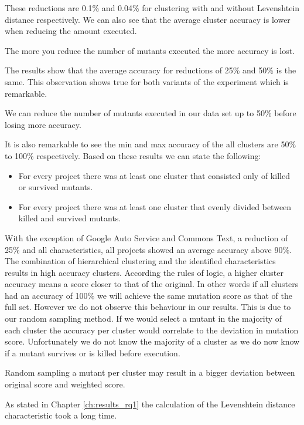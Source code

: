 \documentclass[../main]{subfiles}
\begin{document}
These reductions are 0.1\% and 0.04\% for clustering with and without Levenshtein distance respectively.
We can also see that the average cluster accuracy is lower when reducing the amount executed.
\begin{finding}
    The more you reduce the number of mutants executed the more accuracy is lost.
\end{finding}
The results show that the average accuracy for reductions of 25\% and 50\% is the same.
This observation shows true for both variants of the experiment which is remarkable.
\begin{finding}
    We can reduce the number of mutants executed in our data set up to 50\% before losing more accuracy.
\end{finding}
It is also remarkable to see the min and max accuracy of the all clusters are 50\% to 100\% respectively.
Based on these results we can state the following:
\begin{itemize}
    \item For every project there was at least one cluster that consisted only of killed or survived mutants.
    \item For every project there was at least one cluster that evenly divided between killed and survived mutants.
\end{itemize}
With the exception of Google Auto Service and Commons Text, a reduction of 25\% and all characteristics, all projects showed an average accuracy above 90\%.
The combination of hierarchical clustering and the identified characteristics results in high accuracy clusters.
\newline
According the rules of logic, a higher cluster accuracy means a score closer to that of the original.
In other words if all clusters had an accuracy of 100\% we will achieve the same mutation score as that of the full set.
However we do not observe this behaviour in our results.
This is due to our random sampling method.
If we would select a mutant in the majority of each cluster the accuracy per cluster would correlate to the deviation in mutation score.
Unfortunately we do not know the majority of a cluster as we do now know if a mutant survives or is killed before execution.
\begin{finding}
    Random sampling a mutant per cluster may result in a bigger deviation between original score and weighted score.
\end{finding}
As stated in Chapter \ref{ch:results_rq1} the calculation of the Levenshtein distance characteristic took a long time.
\end{document}
